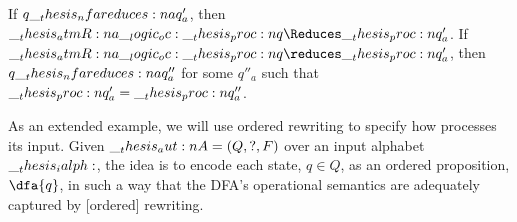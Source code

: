 \begin{corollary}
  If $q \nfareduces[a] q'_a$, then $\atmR{a} \oc \proc{q} \Reduces \proc{q}'_a$.
  If $\atmR{a} \oc \proc{q} \reduces \proc{q}'_a$, then $q \nfareduces[a] q''_a$ for some $q''_a$ such that $\__thesis_proc:n {q}'_a = \__thesis_proc:n {q}''_a$.
\end{corollary}

As an extended example, we will use ordered rewriting to specify how  processes its input.
%
%
Given  $\__thesis_aut:n {A} = (Q, ?, F)$ over an input alphabet $\__thesis_ialph:$, the idea is to encode each state, $q \in Q$, as an ordered proposition, $\dfa{q}$, in such a way that the \ac{DFA}'s operational semantics are adequately captured by [ordered] rewriting.
%
%



